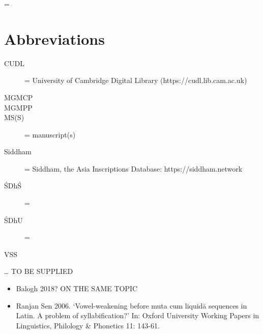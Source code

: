 \documentclass[11pt]{book}
\begin{document}
\begin{description}

\item[\similar]

\item[\compare]

\item[ = ]

\end{description}


\section{Abbreviations}

\begin{description}

\item[CUDL] = University of Cambridge Digital Library  
  (https://cudl.lib.cam.ac.uk)
  
\item[\fol]

\item[\fols]

\item[MGMCP]

\item[MGMPP]

\item[MS(S)] = manuscript(s)

\item[Siddham] = Siddham, the Asia Inscriptions Database:
https://siddham.network 

\item[ŚDhŚ] = \SDhS

\item[ŚDhU] = \SDhU
  
\item[VSS] 
  
\end{description}




\ldots{} TO BE SUPPLIED




\begin{itemize}
\item
  Balogh 2018? ON THE SAME TOPIC
\item
  Ranjan Sen 2006. `Vowel-weakening before muta cum liquidā sequences in
  Latin. A problem of syllabification?' In: Oxford University Working
  Papers in Linguistics, Philology \& Phonetics 11: 143-61.
\end{itemize}
\end{document}
